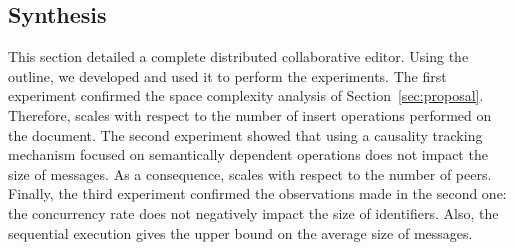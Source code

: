 \subsection{Synthesis}
This section detailed a complete distributed collaborative editor.  Using the
outline, we developed \CRATE and used it to perform the experiments. The
first experiment confirmed the space complexity analysis of
Section~\ref{sec:proposal}. Therefore, \CRATE scales with respect to the
number of insert operations performed on the document. The second experiment
showed that using a causality tracking mechanism focused on semantically
dependent operations does not impact the size of messages. As a consequence,
\CRATE scales with respect to the number of peers. Finally, the third
experiment confirmed the observations made in the second one: the concurrency
rate does not negatively impact the size of identifiers. Also, the sequential
execution gives the upper bound on the average size of messages.


